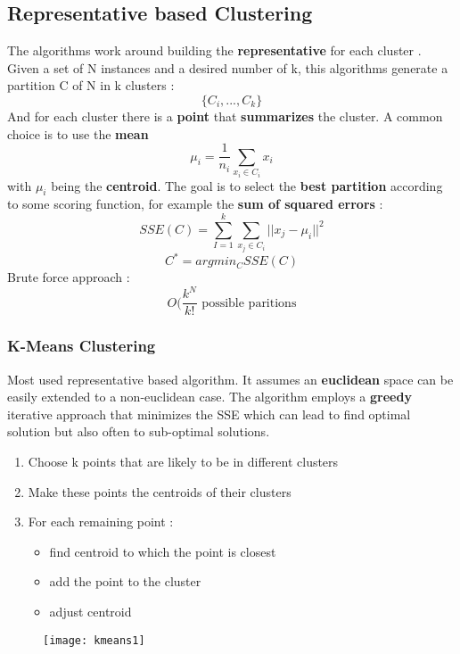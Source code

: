 \subsection{Representative based Clustering}
The algorithms work around building the \textbf{representative} for each cluster .
Given a set of N instances and a desired number of k, this algorithms generate a partition C of N in k clusters :$$ \{C_i,...,C_k\}$$
And for each cluster there is a \textbf{point} that \textbf{summarizes} the cluster.
A common choice is to use the \textbf{mean} $$ \mu_i = \frac{1}{n_i} \sum \limits_{x_i \in C_i} x_i$$
with $\mu_i$ being the \textbf{centroid}.
The goal is to select the \textbf{best partition} according to some scoring function, for example the \textbf{sum of squared errors} :
$$ SSE(C) = \sum \limits_{I=1}^{k} \sum_{x_j \in C_i}|| x_j - \mu_i||^2 $$
$$ C^{*} = argmin_C SSE(C)$$
Brute force approach : $$ O(\frac{k^N}{k!} \text{ possible paritions}$$


\subsubsection{K-Means Clustering}
Most used representative based algorithm. It assumes an \textbf{euclidean} space can be easily extended to a non-euclidean case. The algorithm employs a \textbf{greedy} iterative approach that minimizes the SSE which can lead to find optimal solution but also often to sub-optimal solutions.
\begin{enumerate}
\item Choose k points that are likely to be in different clusters
\item Make these points the centroids of their clusters
\item For each remaining point : 
\begin{itemize}
\item find centroid to which the point is closest
\item add the point to the cluster
\item adjust centroid 
\end{itemize}
\end{enumerate}
\begin{figure}[H]
  \centering
  \texttt{[image: kmeans1]}
\end{figure}

